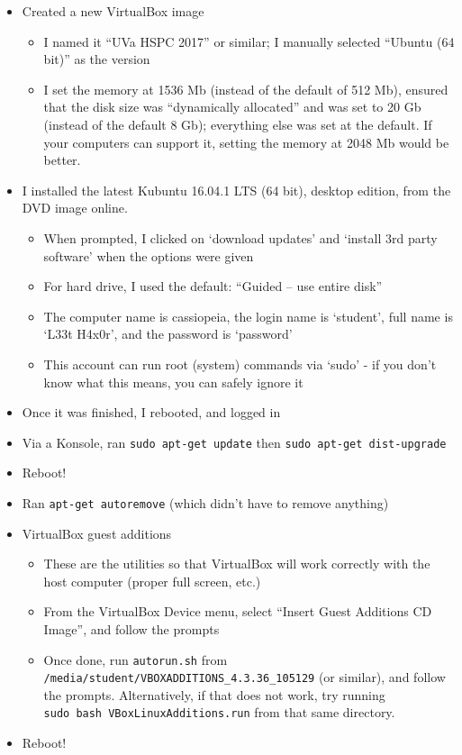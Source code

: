 \begin{itemize}
\tightlist
\item Created a new VirtualBox image

  \begin{itemize}
  \tightlist
  \item I named it ``UVa HSPC 2017'' or similar; I manually selected
    ``Ubuntu (64 bit)'' as the version
  \item I set the memory at 1536 Mb (instead of the default of 512
    Mb), ensured that the disk size was ``dynamically allocated'' and
    was set to 20 Gb (instead of the default 8 Gb); everything else
    was set at the default.  If your computers can support it, setting
    the memory at 2048 Mb would be better.
  \end{itemize}
\item  I installed the latest Kubuntu 16.04.1 LTS (64 bit), desktop edition, from the
  DVD image online.

  \begin{itemize}
  \tightlist
  \item When prompted, I clicked on `download updates' and `install
    3rd party software' when the options were given
  \item For hard drive, I used the default: ``Guided -- use entire disk''
  \item The computer name is cassiopeia, the login name is `student', full
    name is `L33t H4x0r', and the password is `password'
  \item  This account can run root (system) commands via `sudo' - if you
    don't know what this means, you can safely ignore it
  \end{itemize}
  
\item Once it was finished, I rebooted, and logged in
\item Via a Konsole, ran \texttt{sudo\ apt-get\ update} then
  \texttt{sudo\ apt-get\ dist-upgrade}
\item Reboot!
\item Ran \texttt{apt-get\ autoremove} (which didn't have to remove
  anything)
\item  VirtualBox guest additions

  \begin{itemize}
  \tightlist
  \item These are the utilities so that VirtualBox will work correctly
    with the host computer (proper full screen, etc.)
  \item From the VirtualBox Device menu, select ``Insert Guest
    Additions CD Image'', and follow the prompts
  \item Once done, run \texttt{autorun.sh} from
    \texttt{/media/student/VBOXADDITIONS\_4.3.36\_105129} (or
    similar), and follow the prompts. Alternatively, if that does not
    work, try running \texttt{sudo\ bash\ VBoxLinuxAdditions.run} from
    that same directory.
  \end{itemize}

\item Reboot!
\end{itemize}


